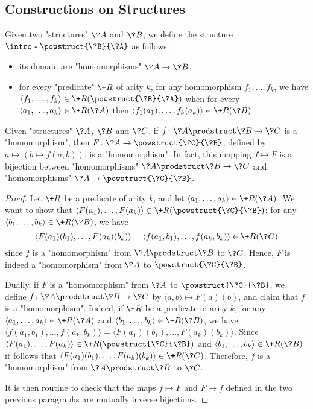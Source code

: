 \subsection{Constructions on Structures}

Given two "structures" $\?A$ and $\?B$, we define the structure \AP$\intro*\powstruct{\?B}{\?A}$ as follows:
\begin{itemize}
  \item its domain are "homomorphisms" $\?A \to \?B$,
  \item for every "predicate" $\+R$ of arity $k$, for any homomorphism $f_1,\hdots,f_k$,
  we have $\langle f_1,\hdots,f_k\rangle \in \+R(\powstruct{\?B}{\?A})$ when for every
  $\langle a_1,\hdots,a_k\rangle \in \+R(\?A)$
  then $\langle f_1(a_1), \hdots, f_k(a_k) \rangle \in \+R(\?B)$.
\end{itemize}


\begin{proposition}
	\AP\label{prop:currying-hom}
	Given "structures" $\?A$, $\?B$ and $\?C$, if $f\colon \?A\prodstruct \?B \to \?C$
	is a "homomorphism", then $F\colon \?A \to \powstruct{\?C}{\?B}$,
	defined by $a \mapsto (b \mapsto f(a,b))$, is a "homomorphism".
	In fact, this mapping $f \mapsto F$ is a bijection
	between "homomorphisms" $\?A\prodstruct \?B \to \?C$
	and "homomorphisms" $\?A \to \powstruct{\?C}{\?B}$.
\end{proposition}

\begin{proof}
Let $\+R$ be a predicate of arity $k$, and let
$\langle a_1,\hdots,a_k \rangle \in \+R(\?A)$.
We want to show that $\langle F(a_1),\hdots,F(a_k) \rangle \in \+R(\powstruct{\?C}{\?B})$:
for any $\langle b_1,\hdots,b_k \rangle \in \+R(\?B)$, we have
\[\langle F(a_1)(b_1), \hdots, F(a_k)(b_k)\rangle = \langle f(a_1,b_1),\hdots,f(a_k,b_k) \rangle \in \+R(\?C)\] since $f$ is a "homomorphism" from $\?A\prodstruct \?B$ to $\?C$.
Hence, $F$ is indeed a "homomorphism" from $\?A$ to $\powstruct{\?C}{\?B}$.

Dually, if $F$ is a "homomorphism" from $\?A$ to $\powstruct{\?C}{\?B}$,
we define $f\colon \?A\prodstruct \?B \to \?C$ by $\langle a,b \rangle \mapsto F(a)(b)$,
and claim that $f$ is a "homomorphism". Indeed, if $\+R$ be a predicate of arity $k$,
for any $\langle a_1, \hdots, a_k \rangle \in \+R(\?A)$
and $\langle b_1, \hdots, b_k \rangle \in \+R(\?B)$,
we have $\langle f(a_1,b_1), \hdots, f(a_k,b_k) \rangle
= \langle F(a_1)(b_1), \hdots, F(a_k)(b_k) \rangle$.
Since $\langle F(a_1), \hdots, F(a_k) \rangle \in \+R(\powstruct{\?C}{\?B})$
and $\langle b_1, \hdots,b_k \rangle \in \+R(\?B)$ 
it follows that $\langle F(a_1)(b_1), \hdots, F(a_k)(b_k) \rangle \in \+R(\?C)$.
Therefore, $f$ is a "homomorphism" from $\?A \prodstruct \?B$ to $\?C$.

It is then routine to check that the maps $f \mapsto F$ and $F \mapsto f$ defined
in the two previous paragraphs are mutually inverse bijections.
\end{proof}

